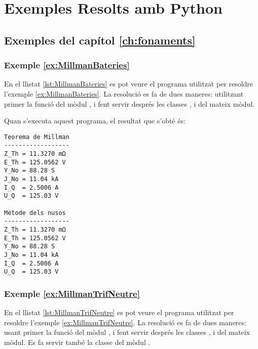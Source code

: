 \chapter{Exemples Resolts amb Python}\label{chap:python-exemples}


\section{Exemples del capítol \ref*{ch:fonaments}}

\hypertarget{exemple:MillmanBateries}{\subsection{Exemple \ref*{ex:MillmanBateries} \MillmanBateries}}

En el llistat \vref{lst:MillmanBateries} es pot veure el programa utilitzat per resoldre l'exemple \vref{ex:MillmanBateries}. La resolució es fa de dues maneres: utilitzant primer la funció  del mòdul , i fent servir després les classes ,  i   del mateix mòdul.


Quan s'executa aquest programa, el resultat que s'obté és:
\lstset{
	language=,
	numbers=none,
	frame=none
}
\begin{lstlisting}
Teorema de Millman
------------------
Z_Th = 11.3270 mΩ
E_Th = 125.0562 V
Y_No = 88.28 S
J_No = 11.04 kA
I_Q  = 2.5006 A
U_Q  = 125.03 V

Mètode dels nusos
------------------
Z_Th = 11.3270 mΩ
E_Th = 125.0562 V
Y_No = 88.28 S
J_No = 11.04 kA
I_Q  = 2.5006 A
U_Q  = 125.03 V
\end{lstlisting} 


\hypertarget{exemple:MillmanTrifNeutre}{\subsection{Exemple \ref*{ex:MillmanTrifNeutre} \MillmanTrifNeutre}}

En el llistat \vref{lst:MillmanTrifNeutre} es pot veure el programa utilitzat per resoldre l'exemple \vref{ex:MillmanTrifNeutre}. La resolució es fa de dues maneres: usant primer la funció  del mòdul , i fent servir després les classes ,  i   del mateix mòdul. Es fa servir també la classe  del mòdul .


